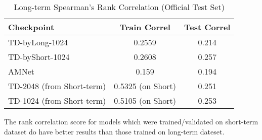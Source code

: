 \begin{table}[h]
\begin{center}
\begin{tabular}{@{}lcc@{}}
Checkpoint & Train Correl & Test Correl \\ \midrule
TD-byLong-1024 & 0.2559 & 0.214 \\
TD-byShort-1024 & 0.2608 & 0.257 \\
AMNet & 0.159 & 0.194 \\
TD-2048 (from Short-term) & 0.5325 (on Short) & 0.251 \\
TD-1024 (from Short-term) & 0.5105 (on Short) & 0.253
\end{tabular}
\caption{Long-term Spearman's Rank Correlation (Official Test Set)}
\end{center}
\end{table}

The rank correlation score for models which were trained/validated on short-term dataset do have better results than those trained on long-term dateset.